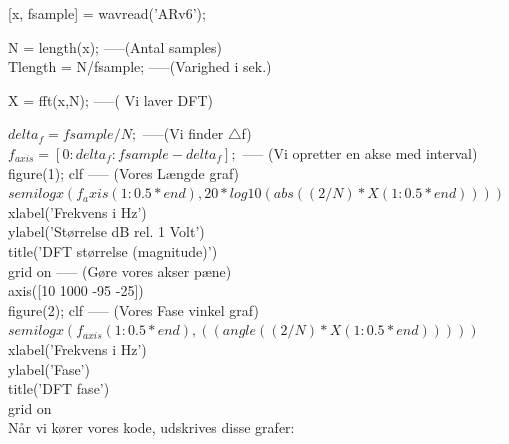 \documentclass[12pt, letterpaper]{article}
\begin{document}
[x, fsample] = wavread('ARv6');

N = length(x);       -----(Antal samples)  \\       
Tlength = N/fsample;     -----(Varighed i sek.)              

X = fft(x,N);   -----( Vi laver DFT)                       

$delta_f = fsample/N;$  -----(Vi finder $\bigtriangleup$f)   \\ 
$f_{axis} = [0:delta_f:fsample-delta_f];$ ----- (Vi opretter en akse med interval)\\ 

figure(1); clf  ----- (Vores Længde graf)    \\   
$semilogx(f_axis(1:0.5*end), 20*log10(abs((2/N)*X(1:0.5*end))))$\\
xlabel('Frekvens i Hz') \\
ylabel('Størrelse dB rel. 1 Volt') \\
title('DFT størrelse (magnitude)') \\
grid on       -----   (Gøre vores akser pæne)   \\   
axis([10 1000 -95 -25]) \\

figure(2); clf 		-----  (Vores Fase vinkel graf)   \\                     
$semilogx(f_{axis}(1:0.5*end), ((angle((2/N)*X(1:0.5*end)))))$\\
xlabel('Frekvens i Hz')\\
ylabel('Fase')\\
title('DFT fase')\\
grid on \\

Når vi kører vores kode, udskrives disse grafer: 
\end{document}
